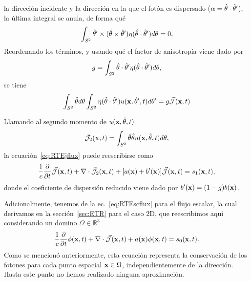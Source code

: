 la dirección incidente y la dirección en la que el fotón es dispersado ($\alpha=\hat{\theta} \cdot \hat{\theta}'$), la última integral se anula, de forma qué 
\begin{equation}
\begin{split}
\begin{aligned}
\int_{S^2}  \hat{\theta}' \times(\hat{\theta} \times \hat{\theta}') \eta(\hat{\theta} \cdot \hat{\theta}') d\theta =0,
\end{aligned}
\end{split}
\label{eq:RTEjint2}
\end{equation}
Reordenando los términos, y usando qué
el factor de anisotropía viene dado por 
\begin{equation}
g=\int_{S^2} \hat{\theta} \cdot \hat{\theta}' \eta(\hat{\theta} \cdot \hat{\theta}') d\theta,
\label{eq:gnorm}
\end{equation}
se tiene 
\begin{equation}
\begin{split}
\begin{aligned}
\int_{S^2} \hat{\theta} d\theta \int_{S^2} \eta(\hat{\theta} \cdot \hat{\theta}')  u(\mathbf{x},\hat{\theta}',t) d\theta' 
=g \vec{ \mathcal{J}}(\mathbf{x},t)
\end{aligned}
\end{split}
\label{eq:RTEjint}
\end{equation}

Llamando al segundo momento de $u(\mathbf{x},\hat{\theta},t)$
\begin{equation}
\bar{\mathcal{J}}_2(\mathbf{x},t)=\int_{S^2} \hat{\theta} \hat{\theta} u(\mathbf{x},\hat{\theta},t) d\theta,
\label{eq:RTEjflux2}
\end{equation}
la ecuación~\eqref{eq:RTEjflux} puede reescribirse como
\begin{equation}
\begin{split}
\begin{aligned}
\frac{1}{c}\frac{\partial}{\partial t} \vec{ \mathcal{J}}(\mathbf{x},t)+\nabla \cdot \bar{\mathcal{J}}_2(\mathbf{x},t)+[a(\mathbf{x})+b'(\mathbf{x})]\vec{ \mathcal{J}}(\mathbf{x},t)=s_1(\mathbf{x},t),
\end{aligned}
\end{split}
\label{eq:RTEjfluxf}
\end{equation}
donde el coeficiente de dispersión reducido viene dado por $b'(\mathbf{x})=(1-g)b(\mathbf{x})$.

Adicionalmente, tenemos de la ec.~\eqref{eq:RTEscflux} para el flujo escalar, la cual derivamos en la 
sección~\ref{sec:ETR} para el caso 2D, que reescribimos aquí considerando un domino $\Omega \in \mathbb{R}^3$
\begin{equation}
\frac{1}{c}\frac{\partial}{\partial t} \phi(\mathbf{x},t)+\nabla \cdot \vec{ \mathcal{J}}(\mathbf{x},t)
+a(\mathbf{x})\phi(\mathbf{x},t)=s_0(\mathbf{x},t).
\label{eq:RTEscfluxap}
\end{equation}
Como se mencionó anteriormente, esta ecuación representa la conservación 
de los fotones para cada punto espacial $\mathbf{x} \in \Omega$, independientemente 
de la dirección. Hasta este punto no hemos realizado ninguna aproximación.

